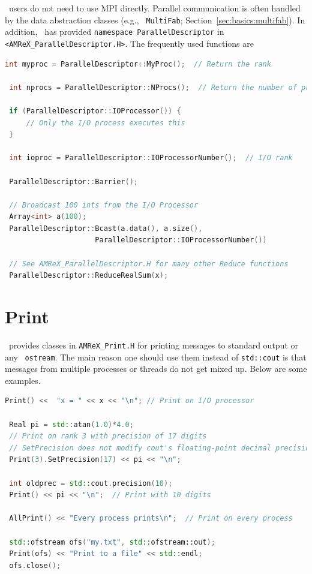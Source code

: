 \amrex\ users do not need to use MPI directly.  Parallel communication
is often handled by the data abstraction classes (e.g., {\tt
  MultiFab}; Section~\ref{sec:basics:multifab}).  In addition, \amrex\
has provided {\tt namespace ParallelDescriptor} in {\tt
  <AMReX\_ParallelDescriptor.H>}.  The frequently used functions are
\begin{lstlisting}[language=cpp]
 int myproc = ParallelDescriptor::MyProc();  // Return the rank
 
 int nprocs = ParallelDescriptor::NProcs();  // Return the number of processes
 
 if (ParallelDescriptor::IOProcessor()) { 
     // Only the I/O process executes this
 }
 
 int ioproc = ParallelDescriptor::IOProcessorNumber();  // I/O rank
 
 ParallelDescriptor::Barrier();
 
 // Broadcast 100 ints from the I/O Processor
 Array<int> a(100);
 ParallelDescriptor::Bcast(a.data(), a.size(),
                     ParallelDescriptor::IOProcessorNumber())
 
 // See AMReX_ParallelDescriptor.H for many other Reduce functions 
 ParallelDescriptor::ReduceRealSum(x);
\end{lstlisting}

\section{Print}
\label{sec:basics:print}

\amrex\ provides classes in {\tt AMReX\_Print.H} for printing messages
to standard output or any \cpp\ {\tt ostream}.  The main reason one
should use them instead of {\tt std::cout} is that messages from
multiple processes or threads do not get mixed up.  Below are some
examples.
\begin{lstlisting}[language=cpp]
 Print() <<  "x = " << x << "\n"; // Print on I/O processor
 
 Real pi = std::atan(1.0)*4.0;
 // Print on rank 3 with precision of 17 digits
 // SetPrecision does not modify cout's floating-point decimal precision setting.
 Print(3).SetPrecision(17) << pi << "\n";

 int oldprec = std::cout.precision(10);
 Print() << pi << "\n";  // Print with 10 digits
 
 AllPrint() << "Every process prints\n";  // Print on every process
 
 std::ofstream ofs("my.txt", std::ofstream::out);
 Print(ofs) << "Print to a file" << std::endl;
 ofs.close();
\end{lstlisting}

